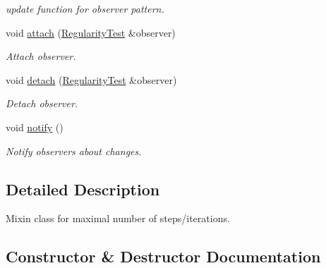 \begin{DoxyCompactItemize}
\begin{DoxyCompactList}\small\item\em update function for observer pattern. \end{DoxyCompactList}\item 
\hypertarget{classSpacy_1_1Mixin_1_1MixinConnection_abb5520ee6b22dd993d78f142939a1ed4}{}void \hyperlink{classSpacy_1_1Mixin_1_1MixinConnection_abb5520ee6b22dd993d78f142939a1ed4}{attach} (\hyperlink{classSpacy_1_1Mixin_1_1RegularityTest}{Regularity\+Test} \&observer)\label{classSpacy_1_1Mixin_1_1MixinConnection_abb5520ee6b22dd993d78f142939a1ed4}

\begin{DoxyCompactList}\small\item\em Attach observer. \end{DoxyCompactList}\item 
\hypertarget{classSpacy_1_1Mixin_1_1MixinConnection_adda739590c487679c26f60e50aedb73f}{}void \hyperlink{classSpacy_1_1Mixin_1_1MixinConnection_adda739590c487679c26f60e50aedb73f}{detach} (\hyperlink{classSpacy_1_1Mixin_1_1RegularityTest}{Regularity\+Test} \&observer)\label{classSpacy_1_1Mixin_1_1MixinConnection_adda739590c487679c26f60e50aedb73f}

\begin{DoxyCompactList}\small\item\em Detach observer. \end{DoxyCompactList}\item 
\hypertarget{classSpacy_1_1Mixin_1_1MixinConnection_a1ddeaa78a3bb4a38c2cca36d1f99fe36}{}void \hyperlink{classSpacy_1_1Mixin_1_1MixinConnection_a1ddeaa78a3bb4a38c2cca36d1f99fe36}{notify} ()\label{classSpacy_1_1Mixin_1_1MixinConnection_a1ddeaa78a3bb4a38c2cca36d1f99fe36}

\begin{DoxyCompactList}\small\item\em Notify observers about changes. \end{DoxyCompactList}\end{DoxyCompactItemize}


\subsection{Detailed Description}
Mixin class for maximal number of steps/iterations. 

\subsection{Constructor \& Destructor Documentation}
\hypertarget{classSpacy_1_1Mixin_1_1RegularityTest_ae2887fec9a5bdd42239b3df6750bf2e9}{}
